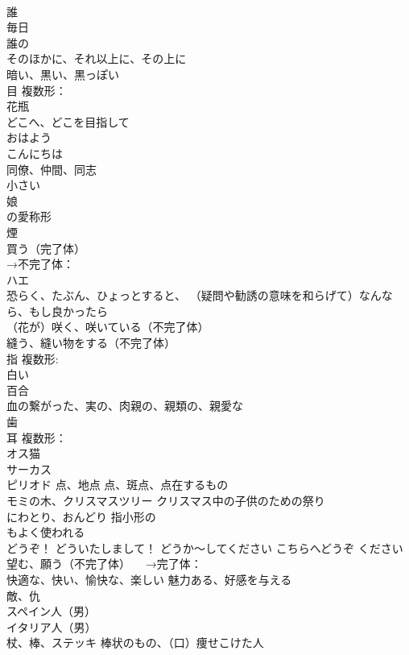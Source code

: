 \documentclass[8pt]{extreport}
\begin{document}
\begin{CJK}{UTF8}{min}
\\	誰
\\	毎日
\\	誰の 
\\	そのほかに、それ以上に、その上に
\\	暗い、黒い、黒っぽい
\\	目 複数形：
\\	花瓶
\\	どこへ、どこを目指して
\\	おはよう
\\	こんにちは
\\	同僚、仲間、同志
\\	小さい
\\	娘
\\	の愛称形
\\	煙
\\	買う（完了体） 
\\	→不完了体：
\\	ハエ
\\	[挿入語]恐らく、たぶん、ひょっとすると、 （疑問や勧誘の意味を和らげて）なんなら、もし良かったら
\\	（花が）咲く、咲いている（不完了体） 
\\	縫う、縫い物をする（不完了体）
\\	指 複数形:
\\	白い
\\	百合
\\	血の繋がった、実の、肉親の、親類の、親愛な
\\	歯
\\	耳 複数形：
\\	オス猫
\\	サーカス
\\	ピリオド 点、地点 点、斑点、点在するもの
\\	モミの木、クリスマスツリー クリスマス中の子供のための祭り
\\	にわとり、おんどり 指小形の
\\	もよく使われる
\\	どうぞ！ どういたしまして！ どうか〜してください こちらへどうぞ ください
\\	望む、願う（不完了体） 　→完了体：
\\	快適な、快い、愉快な、楽しい 魅力ある、好感を与える
\\	敵、仇
\\	スペイン人（男）
\\	イタリア人（男）
\\	杖、棒、ステッキ 棒状のもの、（口）痩せこけた人

\end{CJK}
\end{document}
